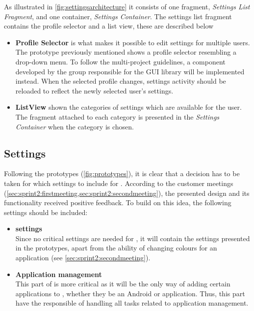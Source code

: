 As illustrated in \cref{fig:settingsarchitecture} it consists of one fragment, \textit{Settings List Fragment}, and one container, \textit{Settings Container}.
The settings list fragment contains the profile selector and a list view, these are described below
\begin{itemize}
\item \textbf{Profile Selector} is what makes it possible to edit settings for multiple users.
The prototype previously mentioned shows a profile selector resembling a drop-down menu.
To follow the multi-project guidelines, a component developed by the group responsible for the GUI library will be implemented instead.
When the selected profile changes, settings activity should be reloaded to reflect the newly selected user's settings.
\item \textbf{ListView} shown the categories of settings which are available for the user.
The fragment attached to each category is presented in the \textit{Settings Container} when the category is chosen.
\end{itemize}

\subsection{\launcher Settings}\label{sec:launchersettings}
Following the prototypes (\cref{fig:prototypes}), it is clear that a decision has to be taken for which settings to include for \launcher.
According to the customer meetings (\cref{sec:sprint2:firstmeeting,sec:sprint2:secondmeeting}), the presented design and its functionality received positive feedback.
To build on this idea, the following settings should be included:

\begin{itemize}
\item \textbf{\launcher settings}\\
Since no critical settings are needed for \launcher, it will contain the settings presented in the prototypes, apart from the ability of changing colours for an application (see \cref{sec:sprint2:secondmeeting}).
\item \textbf{Application management}\\
This part of \launcher is more critical as it will be the only way of adding certain applications to \launcher, whether they be an Android or \giraf application.
Thus, this part have the responsible of handling all tasks related to application management.
\end{itemize}

















